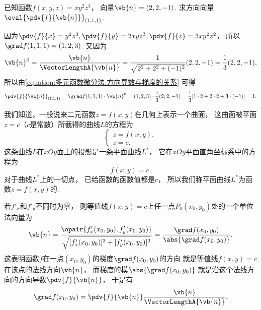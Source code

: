 \begin{example}
已知函数\(f(x,y,z) = x y^2 z^3\)，
向量\(\vb{n} = (2,2,-1)\).
求方向向量\(\eval{\pdv{f}{\vb{n}}}_{(1,1,1)}\).
\begin{solution}
因为\(\pdv{f}{x} = y^2 z^3,
\pdv{f}{y} = 2 x y z^3,
\pdv{f}{z} = 3 x y^2 z^2\)，
所以\(\grad f(1,1,1) = (1,2,3)\).
又因为\begin{equation*}
	\vb{n}^0
	= \frac{\vb{n}}{\VectorLengthA{\vb{n}}}
	= \frac1{\sqrt{2^2+2^2+(-1)^2}} (2,2,-1)
	= \frac13 (2,2,-1),
\end{equation*}
所以由\cref{equation:多元函数微分法.方向导数与梯度的关系} 可得\begin{equation*}
	\pdv{f}{\vb{n}}_{(1,1,1)}
	= \grad f(1,1,1) \cdot \vb{n}^0
	= (1,2,3) \cdot \frac13 (2,2,-1)
	= \frac13 [1\cdot2+2\cdot2+3\cdot(-1)]
	= 1.
\end{equation*}
\end{solution}
\end{example}

我们知道，一般说来二元函数\(z = f(x,y)\)在几何上表示一个曲面，
这曲面被平面\(z = c\)（\(c\)是常数）所截得的曲线\(L\)的方程为\begin{equation*}
	\begin{cases}
		z = f(x,y), \\
		z = c.
	\end{cases}
\end{equation*}
这条曲线\(L\)在\(xOy\)面上的投影是一条平面曲线\(L^*\)，
它在\(xOy\)平面直角坐标系中的方程为\begin{equation*}
	f(x,y) = c.
\end{equation*}
对于曲线\(L^*\)上的一切点，
已给函数的函数值都是\(c\)，
所以我们称平面曲线\(L^*\)为函数\(z = f(x,y)\)的.

若\(f'_x\)和\(f'_y\)不同时为零，
则等值线\(f(x,y) = c\)上任一点\(P_0(x_0,y_0)\)处的一个单位法向量为\begin{equation*}
	\vb{n}
	= \frac{\opair{f'_x(x_0,y_0),f'_y(x_0,y_0)}}{\sqrt{[f'_x(x_0,y_0)]^2+[f'_y(x_0,y_0)]^2}}
	= \frac{\grad f(x_0,y_0)}{\abs{\grad f(x_0,y_0)}}.
\end{equation*}
这表明函数\(f\)在一点\((x_0,y_0)\)的梯度\(\grad f(x_0,y_0)\)的方向
就是等值线\(f(x,y) = c\)在该点的法线方向\(\vb{n}\)，
而梯度的模\(\abs{\grad f(x_0,y_0)}\)
就是沿这个法线方向的方向导数\(\pdv{f}{\vb{n}}\)，
于是有\begin{equation*}
	\grad f(x_0,y_0) = \pdv{f}{\vb{n}} \frac{\vb{n}}{\VectorLengthA{\vb{n}}}.
\end{equation*}

